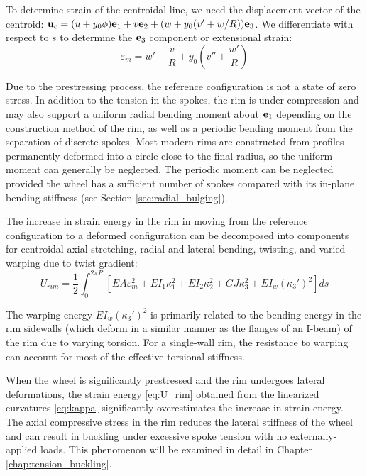 \documentclass[\rootdir/thesis.tex]{subfiles}
\begin{document}
To determine strain of the centroidal line, we need the displacement vector of the centroid: $\mathbf{u}_c = (u+y_0\phi)\mathbf{e}_1 + v\mathbf{e}_2 + (w+y_0 (v'+w/R))\mathbf{e}_3$. We differentiate with respect to $s$ to determine the $\mathbf{e}_3$ component or extensional strain:
\begin{equation}
\label{eq:mem_strain}
\varepsilon_m = w' - \frac{v}{R} + y_0\left(v'' + \frac{w'}{R} \right)
\end{equation}

Due to the prestressing process, the reference configuration is not a state of zero stress. In addition to the tension in the spokes, the rim is under compression \cite{Sharp1977} and may also support a uniform radial bending moment about $\mathbf{e}_1$ depending on the construction method of the rim, as well as a periodic bending moment from the separation of discrete spokes. Most modern rims are constructed from profiles permanently deformed into a circle close to the final radius, so the uniform moment can generally be neglected. The periodic moment can be neglected provided the wheel has a sufficient number of spokes compared with its in-plane bending stiffness (see Section \ref{sec:radial_bulging}).

The increase in strain energy in the rim in moving from the reference configuration to a deformed configuration can be decomposed into components for centroidal axial stretching, radial and lateral bending, twisting, and varied warping due to twist gradient:
\begin{equation}
\label{eq:U_rim}
U_{rim} = \frac{1}{2} \int_0^{2\pi R}[EA\varepsilon_m^2 + EI_1\kappa_1^2+EI_2\kappa_2^2 + GJ\kappa_3^2 + EI_w(\kappa_3')^2]ds
\end{equation}

The warping energy $EI_w(\kappa_3')^2$ is primarily related to the bending energy in the rim sidewalls (which deform in a similar manner as the flanges of an I-beam) of the rim due to varying torsion. For a single-wall rim, the resistance to warping can account for most of the effective torsional stiffness.

When the wheel is significantly prestressed and the rim undergoes lateral deformations, the strain energy \eqref{eq:U_rim} obtained from the linearized curvatures \eqref{eq:kappa} significantly overestimates the increase in strain energy. The axial compressive stress in the rim reduces the lateral stiffness of the wheel and can result in buckling under excessive spoke tension with no externally-applied loads. This phenomenon will be examined in detail in Chapter \ref{chap:tension_buckling}.
\end{document}
